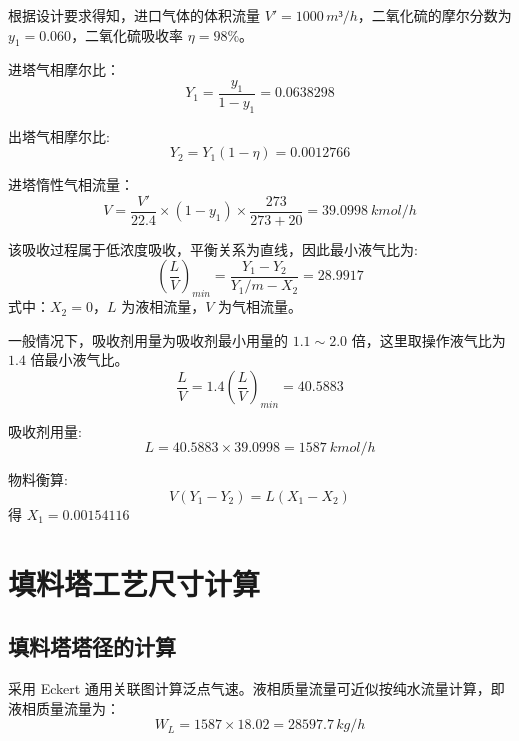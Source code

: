 根据设计要求得知，进口气体的体积流量 $V'=1000 \, m³/h$，二氧化硫的摩尔分数为 $y_1=0.060$，二氧化硫吸收率 $η=98\%$。

进塔气相摩尔比：
\begin{equation}
	Y_1 = \frac{y_1}{1-y_1} = 0.0638298
\end{equation}

出塔气相摩尔比:
\begin{equation}
	Y_2 = Y_1(1-η) = 0.0012766
\end{equation}

进塔惰性气相流量：
\begin{equation}
	V = \frac{V'}{22.4} \times (1-y_1) \times \frac{273}{273+20} = 39.0998 \: kmol/h
\end{equation}

该吸收过程属于低浓度吸收，平衡关系为直线，因此最小液气比为:
\begin{equation}
	\left(\frac{L}{V}\right)_{min} = \frac{Y_1 - Y_2}{Y_1/m - X_2} = 28.9917
\end{equation}
式中：$X_2=0$，$L$ 为液相流量，$V$ 为气相流量。

一般情况下，吸收剂用量为吸收剂最小用量的 $1.1 \sim 2.0$ 倍，这里取操作液气比为 $1.4$ 倍最小液气比。
\begin{equation}
	\frac{L}{V} = 1.4 \left(\frac{L}{V}\right)_{min} = 40.5883
\end{equation}

吸收剂用量:
\begin{equation}
	L = 40.5883 \times 39.0998 = 1587 \: kmol/h
\end{equation}

物料衡算:
\begin{equation}
	V(Y_1-Y_2) = L(X_1-X_2)
\end{equation}
得 $X_1 = 0.00154116$



\section{填料塔工艺尺寸计算}

\subsection{填料塔塔径的计算}

采用 Eckert 通用关联图计算泛点气速。液相质量流量可近似按纯水流量计算，即液相质量流量为：
\begin{equation}
	W_{L} = 1587 \times 18.02 = 28597.7 \, kg/h
\end{equation}

